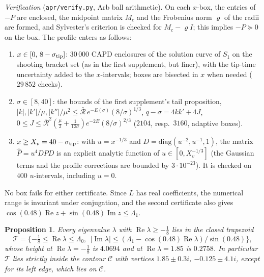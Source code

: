 \documentclass[11pt]{amsart}
\newtheorem{proposition}[theorem]{Proposition}
\theoremstyle{remark}
\newcommand{\re}{\operatorname{Re}}
\newcommand{\im}{\operatorname{Im}}
\begin{document}
\emph{Verification} (\texttt{apr/verify.py}, Arb ball arithmetic). On each $x$-box, the entries of $-P$ are enclosed, the midpoint matrix $M_c$ and the Frobenius norm $\varrho$ of the radii are formed, and Sylvester's criterion is checked for $M_c-\varrho I$; this implies $-P\succeq0$ on the box. The profile enters as follows:
\begin{enumerate}
\item[(1)] $x\in[0,\,8-\sigma_{\rm tip}]$: $30\,000$ CAPD enclosures of the solution curve of $S_1$ on the shooting bracket set (as in the first supplement, but finer), with the tip-time uncertainty added to the $x$-intervals; boxes are bisected in $x$ when needed ($29\,852$ checks).
\item[(2)] $\sigma\in[8,40]$: the bounds of the first supplement's tail proposition, $|k|,|k'|/\mu,|k''|/\mu^2\le\bar{\mathcal R}\,e^{-E(\sigma)}(8/\sigma)^{1/3}$, $q-\sigma=4kk'+4J$, $0\le J\le\bar{\mathcal R}^2(\frac\mu2+\frac1{12\sigma})e^{-2E}(8/\sigma)^{2/3}$ ($2104$, resp.\ $3160$, adaptive boxes).
\item[(3)] $x\ge X_v=40-\sigma_{\rm tip}$: with $u=x^{-1/3}$ and $D=\mathrm{diag}(u^{-2},u^{-1},1)$, the matrix $\hat P=u^4DPD$ is an explicit analytic function of $u\in[0,X_v^{-1/3}]$ (the Gaussian terms and the profile corrections are bounded by $3\cdot10^{-23}$). It is checked on $400$ $u$-intervals, including $u=0$.
\end{enumerate}
No box fails for either certificate. Since $L$ has real coefficients, the numerical range is invariant under conjugation, and the second certificate also gives $\cos(0.48)\re z+\sin(0.48)\im z\le\Lambda_1$.

\begin{proposition}\label{prop:apriori}
Every eigenvalue $\lambda$ with $\re\lambda\ge-\frac18$ lies in the closed trapezoid
\[
\mathcal T=\{-\tfrac18\le\re\lambda\le\Lambda_0,\ \ |\im\lambda|\le(\Lambda_1-\cos(0.48)\re\lambda)/\sin(0.48)\},
\]
whose height at $\re\lambda=-\frac18$ is $4.0694$ and at $\re\lambda=1.85$ is $0.2758$. In particular $\mathcal T$ lies strictly inside the contour $\mathcal C$ with vertices $1.85\pm0.3i$, $-0.125\pm4.1i$, except for its left edge, which lies on $\mathcal C$.
\end{proposition}
\end{document}
